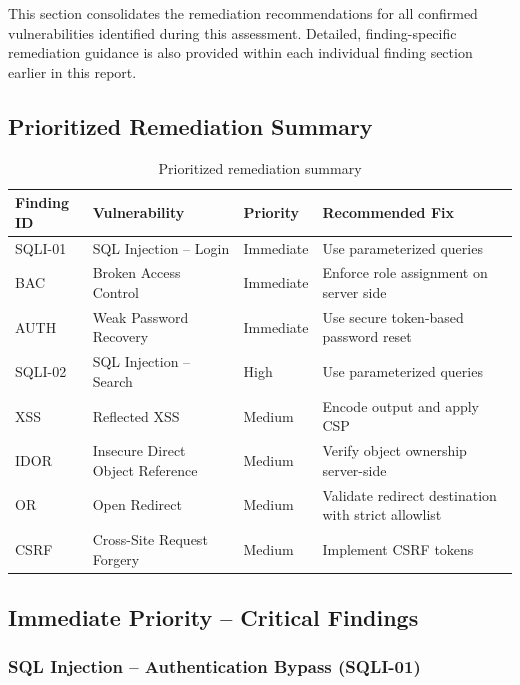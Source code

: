 This section consolidates the remediation recommendations for all
confirmed vulnerabilities identified during this assessment. Detailed,
finding-specific remediation guidance is also provided within each
individual finding section earlier in this report.

\subsection*{Prioritized Remediation Summary}

\begin{table}[H]
\centering
\renewcommand{\arraystretch}{1.3}
\begin{tabular}{|l|p{5cm}|l|p{4cm}|}
\hline
\textbf{Finding ID} & \textbf{Vulnerability} & \textbf{Priority} & \textbf{Recommended Fix} \\
\hline
SQLI-01 & SQL Injection -- Login & Immediate & Use parameterized queries \\
\hline
BAC & Broken Access Control & Immediate & Enforce role assignment on server side \\
\hline
AUTH & Weak Password Recovery & Immediate & Use secure token-based password reset \\
\hline
SQLI-02 & SQL Injection -- Search & High & Use parameterized queries \\
\hline
XSS & Reflected XSS & Medium & Encode output and apply CSP \\
\hline
IDOR & Insecure Direct Object Reference & Medium & Verify object ownership server-side \\
\hline
OR & Open Redirect & Medium & Validate redirect destination with strict allowlist \\
\hline
CSRF & Cross-Site Request Forgery & Medium & Implement CSRF tokens \\
\hline
\end{tabular}
\caption{Prioritized remediation summary}
\end{table}

\subsection*{Immediate Priority -- Critical Findings}

\subsubsection*{SQL Injection -- Authentication Bypass (SQLI-01)}

